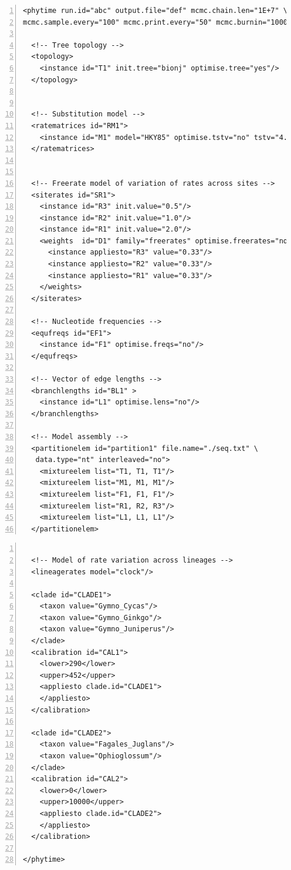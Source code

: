 \documentclass[a4paper,12pt]{article}
\begin{document}
\vspace{0.2cm}
\begin{Verbatim}[frame=single, label=Example of PhyTime XML file, samepage=true, baselinestretch=0.5,
  fontsize=\small, numbers=left]
<phytime run.id="abc" output.file="def" mcmc.chain.len="1E+7" \
mcmc.sample.every="100" mcmc.print.every="50" mcmc.burnin="10000">

  <!-- Tree topology -->
  <topology> 
    <instance id="T1" init.tree="bionj" optimise.tree="yes"/>
  </topology>
  

  <!-- Substitution model -->
  <ratematrices id="RM1">
    <instance id="M1" model="HKY85" optimise.tstv="no" tstv="4.0"/>
  </ratematrices>

  
  <!-- Freerate model of variation of rates across sites -->
  <siterates id="SR1">
    <instance id="R3" init.value="0.5"/>
    <instance id="R2" init.value="1.0"/>
    <instance id="R1" init.value="2.0"/>
    <weights  id="D1" family="freerates" optimise.freerates="no">
      <instance appliesto="R3" value="0.33"/>
      <instance appliesto="R2" value="0.33"/>
      <instance appliesto="R1" value="0.33"/>
    </weights>
  </siterates>

  <!-- Nucleotide frequencies -->
  <equfreqs id="EF1">
    <instance id="F1" optimise.freqs="no"/>
  </equfreqs>

  <!-- Vector of edge lengths -->
  <branchlengths id="BL1" >
    <instance id="L1" optimise.lens="no"/>
  </branchlengths>

  <!-- Model assembly -->
  <partitionelem id="partition1" file.name="./seq.txt" \
   data.type="nt" interleaved="no">
    <mixtureelem list="T1, T1, T1"/>
    <mixtureelem list="M1, M1, M1"/>
    <mixtureelem list="F1, F1, F1"/>
    <mixtureelem list="R1, R2, R3"/>
    <mixtureelem list="L1, L1, L1"/>
  </partitionelem>
\end{Verbatim}

\begin{Verbatim}[frame=single, label=Example of PhyTime XML file (ctnd), samepage=true, baselinestretch=0.5,
  fontsize=\small, numbers=left]
 
  <!-- Model of rate variation across lineages -->
  <lineagerates model="clock"/>

  <clade id="CLADE1">
    <taxon value="Gymno_Cycas"/>
    <taxon value="Gymno_Ginkgo"/>
    <taxon value="Gymno_Juniperus"/>
  </clade>
  <calibration id="CAL1">
    <lower>290</lower>
    <upper>452</upper>
    <appliesto clade.id="CLADE1">
    </appliesto>
  </calibration>

  <clade id="CLADE2">
    <taxon value="Fagales_Juglans"/>
    <taxon value="Ophioglossum"/>
  </clade>
  <calibration id="CAL2">
    <lower>0</lower>
    <upper>10000</upper>
    <appliesto clade.id="CLADE2">
    </appliesto>
  </calibration>

</phytime>
\end{Verbatim}
\end{document}

